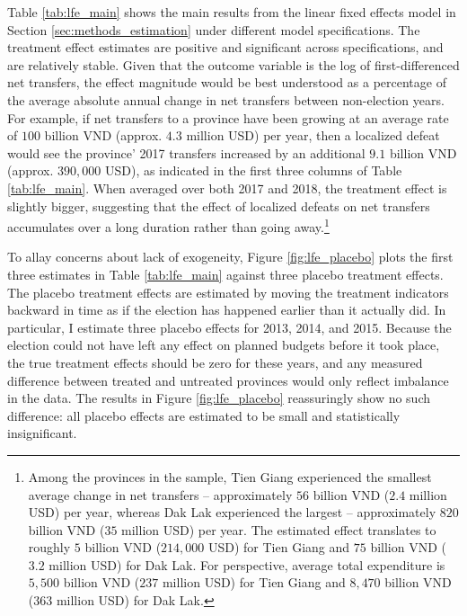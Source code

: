 \documentclass[12pt]{article}
\newcommand\fnote[1]{\footnote{\baselineskip=2\normalbaselineskip#1}}
\newcommand{\1}{\mathbbm{1}}
\begin{document}
Table \ref{tab:lfe_main} shows the main results from the linear fixed effects model in Section \ref{sec:methods_estimation} under different model specifications. The treatment effect estimates are positive and significant across specifications, and are relatively stable. Given that the outcome variable is the log of first-differenced net transfers, the effect magnitude would be best understood as a percentage of the average absolute annual change in net transfers between non-election years. For example, if net transfers to a province have been growing at an average rate of $100$ billion VND (approx. $4.3$ million USD) per year, then a localized defeat would see the province' 2017 transfers increased by an additional $9.1$ billion VND (approx. $390,000$ USD), as indicated in the first three columns of Table \ref{tab:lfe_main}. When averaged over both 2017 and 2018, the treatment effect is slightly bigger, suggesting that the effect of localized defeats on net transfers accumulates over a long duration rather than going away.\fnote{Among the provinces in the sample, Tien Giang experienced the smallest average change in net transfers -- approximately $56$ billion VND ($2.4$ million USD) per year, whereas Dak Lak experienced the largest -- approximately $820$ billion VND ($35$ million USD) per year. The estimated effect translates to roughly $5$ billion VND ($214,000$ USD) for Tien Giang and $75$ billion VND ($3.2$ million USD) for Dak Lak. For perspective, average total expenditure is $5,500$ billion VND ($237$ million USD) for Tien Giang and $8,470$ billion VND ($363$ million USD) for Dak Lak.}

To allay concerns about lack of exogeneity, Figure \ref{fig:lfe_placebo} plots the first three estimates in Table \ref{tab:lfe_main} against three placebo treatment effects. The placebo treatment effects are estimated by moving the treatment indicators backward in time as if the election has happened earlier than it actually did. In particular, I estimate three placebo effects for 2013, 2014, and 2015. Because the election could not have left any effect on planned budgets before it took place, the true treatment effects should be zero for these years, and any measured difference between treated and untreated provinces would only reflect imbalance in the data. The results in Figure \ref{fig:lfe_placebo} reassuringly show no such difference: all placebo effects are estimated to be small and statistically insignificant.
\end{document}
